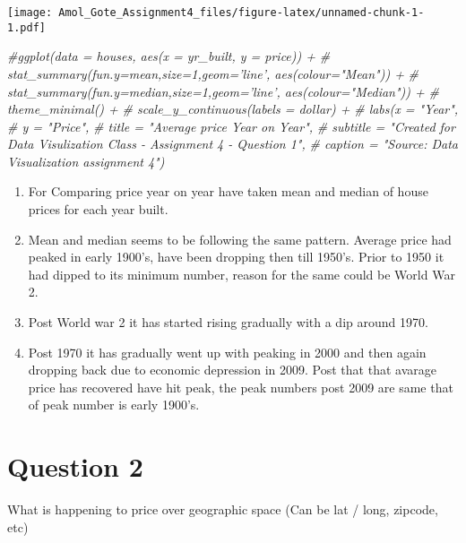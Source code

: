\documentclass[]{article}
\newenvironment{Shaded}{\begin{snugshade}}{\end{snugshade}}
\newcommand{\CommentTok}[1]{\textcolor[rgb]{0.56,0.35,0.01}{\textit{#1}}}
\providecommand{\tightlist}{%
  \setlength{\itemsep}{0pt}\setlength{\parskip}{0pt}}
\begin{document}
\texttt{[image: Amol\_Gote\_Assignment4\_files/figure-latex/unnamed-chunk-1-1.pdf]}

\begin{Shaded}
\begin{Highlighting}[]
\CommentTok{#ggplot(data = houses, aes(x = yr_built, y = price)) +}
\CommentTok{#  stat_summary(fun.y=mean,size=1,geom='line', aes(colour="Mean")) +}
\CommentTok{#  stat_summary(fun.y=median,size=1,geom='line', aes(colour="Median")) +}
\CommentTok{#  theme_minimal() +}
\CommentTok{#  scale_y_continuous(labels = dollar) +}
\CommentTok{#  labs(x = "Year",}
\CommentTok{#  y = "Price",}
\CommentTok{#  title = "Average price Year on Year",}
\CommentTok{#  subtitle = "Created for Data Visulization Class - Assignment 4 - Question 1",}
\CommentTok{#  caption = "Source: Data Visualization assignment 4")}
\end{Highlighting}
\end{Shaded}

\begin{enumerate}
\def\labelenumi{\arabic{enumi}.}
\tightlist
\item
  For Comparing price year on year have taken mean and median of house
  prices for each year built.\\
\item
  Mean and median seems to be following the same pattern. Average price
  had peaked in early 1900's, have been dropping then till 1950's. Prior
  to 1950 it had dipped to its minimum number, reason for the same could
  be World War 2.
\item
  Post World war 2 it has started rising gradually with a dip around
  1970.
\item
  Post 1970 it has gradually went up with peaking in 2000 and then again
  dropping back due to economic depression in 2009. Post that that
  avarage price has recovered have hit peak, the peak numbers post 2009
  are same that of peak number is early 1900's.
\end{enumerate}

\hypertarget{question-2}{%
\section{Question 2}\label{question-2}}

What is happening to price over geographic space (Can be lat / long,
zipcode, etc)
\end{document}
